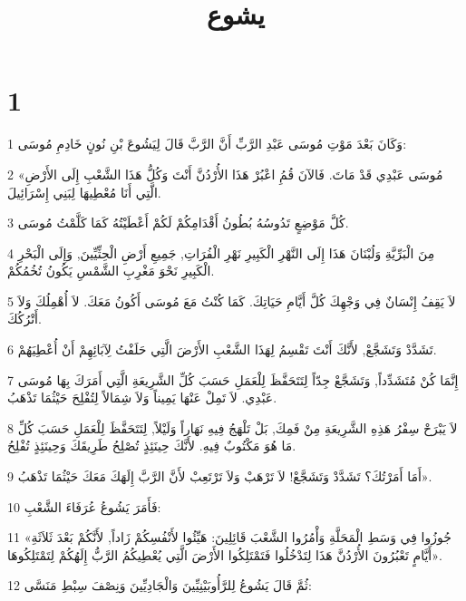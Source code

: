 

\title{يشوع}


\chapter{1}

\par 1 وَكَانَ بَعْدَ مَوْتِ مُوسَى عَبْدِ الرَّبِّ أَنَّ الرَّبَّ قَالَ لِيَشُوعَ بْنِ نُونٍ خَادِمِ مُوسَى:
\par 2 «مُوسَى عَبْدِي قَدْ مَاتَ. فَالآنَ قُمُِ اعْبُرْ هَذَا الأُرْدُنَّ أَنْتَ وَكُلُّ هَذَا الشَّعْبِ إِلَى الأَرْضِ الَّتِي أَنَا مُعْطِيهَا لِبَنِي إِسْرَائِيلَ.
\par 3 كُلَّ مَوْضِعٍ تَدُوسُهُ بُطُونُ أَقْدَامِكُمْ لَكُمْ أَعْطَيْتُهُ كَمَا كَلَّمْتُ مُوسَى.
\par 4 مِنَ الْبَرِّيَّةِ وَلُبْنَانَ هَذَا إِلَى النَّهْرِ الْكَبِيرِ نَهْرِ الْفُرَاتِ, جَمِيعِ أَرْضِ الْحِثِّيِّينَ, وَإِلَى الْبَحْرِ الْكَبِيرِ نَحْوَ مَغْرِبِ الشَّمْسِ يَكُونُ تُخُمُكُمْ.
\par 5 لاَ يَقِفُ إِنْسَانٌ فِي وَجْهِكَ كُلَّ أَيَّامِ حَيَاتِكَ. كَمَا كُنْتُ مَعَ مُوسَى أَكُونُ مَعَكَ. لاَ أُهْمِلُكَ وَلاَ أَتْرُكُكَ.
\par 6 تَشَدَّدْ وَتَشَجَّعْ, لأَنَّكَ أَنْتَ تَقْسِمُ لِهَذَا الشَّعْبِ الأَرْضَ الَّتِي حَلَفْتُ لِآبَائِهِمْ أَنْ أُعْطِيَهُمْ.
\par 7 إِنَّمَا كُنْ مُتَشَدِّداً, وَتَشَجَّعْ جِدّاً لِتَتَحَفَّظَ لِلْعَمَلِ حَسَبَ كُلِّ الشَّرِيعَةِ الَّتِي أَمَرَكَ بِهَا مُوسَى عَبْدِي. لاَ تَمِلْ عَنْهَا يَمِيناً وَلاَ شِمَالاً لِتُفْلِحَ حَيْثُمَا تَذْهَبُ.
\par 8 لاَ يَبْرَحْ سِفْرُ هَذِهِ الشَّرِيعَةِ مِنْ فَمِكَ, بَلْ تَلْهَجُ فِيهِ نَهَاراً وَلَيْلاً, لِتَتَحَفَّظَ لِلْعَمَلِ حَسَبَ كُلِّ مَا هُوَ مَكْتُوبٌ فِيهِ. لأَنَّكَ حِينَئِذٍ تُصْلِحُ طَرِيقَكَ وَحِينَئِذٍ تُفْلِحُ.
\par 9 أَمَا أَمَرْتُكَ؟ تَشَدَّدْ وَتَشَجَّعْ! لاَ تَرْهَبْ وَلاَ تَرْتَعِبْ لأَنَّ الرَّبَّ إِلَهَكَ مَعَكَ حَيْثُمَا تَذْهَبُ».
\par 10 فَأَمَرَ يَشُوعُ عُرَفَاءَ الشَّعْبِ:
\par 11 «جُوزُوا فِي وَسَطِ الْمَحَلَّةِ وَأْمُرُوا الشَّعْبَ قَائِلِينَ: هَيِّئُوا لأَنْفُسِكُمْ زَاداً, لأَنَّكُمْ بَعْدَ ثَلاَثَةِ أَيَّامٍ تَعْبُرُونَ الأُرْدُنَّ هَذَا لِتَدْخُلُوا فَتَمْتَلِكُوا الأَرْضَ الَّتِي يُعْطِيكُمُ الرَّبُّ إِلَهُكُمْ لِتَمْتَلِكُوهَا».
\par 12 ثُمَّ قَالَ يَشُوعُ لِلرَّأُوبَيْنِيِّينَ وَالْجَادِيِّينَ وَنِصْفَ سِبْطِ مَنَسَّى:
